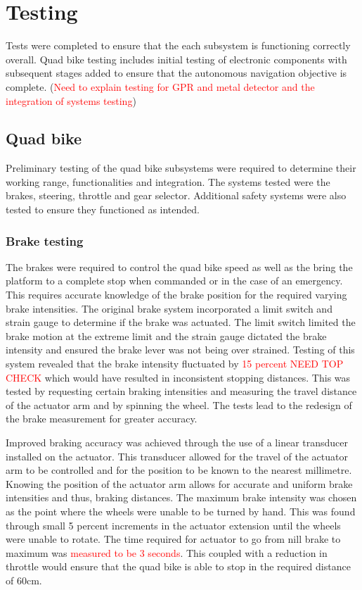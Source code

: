\documentclass[main.tex]{subfiles}
\begin{document}
\chapter{Testing}
Tests were completed to ensure that the each subsystem is functioning correctly overall. Quad bike testing includes initial testing of electronic components with subsequent stages added to ensure that the autonomous navigation objective is complete. 
(\textcolor{red}{Need to explain testing for GPR and metal detector and the integration of systems testing})

\section{Quad bike}
Preliminary testing of the quad bike subsystems were required to determine their working range, functionalities and integration. The systems tested were the brakes, steering, throttle and gear selector. Additional safety systems were also tested to ensure they functioned as intended.

\subsection{Brake testing}
The brakes were required to control the quad bike speed as well as the bring the platform to a complete stop when commanded or in the case of an emergency. This requires accurate knowledge of the brake position for the required varying brake intensities. 
The original brake system incorporated a limit switch and strain gauge to determine if the brake was actuated. The limit switch limited the brake motion at the extreme limit and the strain gauge dictated the brake intensity and ensured the brake lever was not being over strained. Testing of this system revealed that the brake intensity fluctuated by \textcolor{red}{15 percent NEED TOP CHECK } which would have resulted in inconsistent stopping distances. This was tested by requesting certain braking intensities and measuring the travel distance of the actuator arm and by spinning the wheel. The tests lead to the redesign of the brake measurement for greater accuracy. 

Improved braking accuracy was achieved through the use of a linear transducer installed on the actuator. This transducer allowed for the travel of the actuator arm to be controlled and for the position to be known to the nearest millimetre. Knowing the position of the actuator arm allows for accurate and uniform brake intensities and thus, braking distances. The maximum brake intensity was chosen as the point where the wheels were unable to be turned by hand. This was found through small 5 percent increments in the actuator extension until the wheels were unable to rotate. The time required for actuator to go from nill brake to maximum was \textcolor{red}{measured to be 3 seconds}. This coupled with a reduction in throttle would ensure that the quad bike is able to stop in the required distance of 60cm. 
\end{document}
